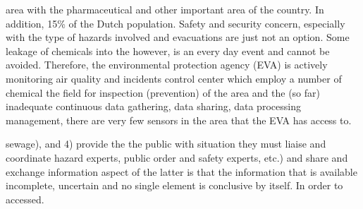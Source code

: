\documentclass[times]{cpeauth}
\begin{document}
area with the %
pharmaceutical and other %
important area of the country. In addition, %
15\% of the Dutch population. Safety and security %
concern, especially with the type of hazards involved and %
evacuations are just not an option. Some leakage of chemicals into the %
however, is an every day event and cannot be avoided. Therefore, the %
environmental protection agency (EVA) is actively monitoring air quality and
incidents %
control center which %
employ a number of chemical %
the field for inspection (prevention) %
of the area and the (so far) inadequate %
continuous data gathering, data sharing, data processing %
management, there are very few sensors in the area that the EVA has %
access to.

sewage), %
and 4) provide the %
the public with situation %
they must liaise and coordinate %
hazard experts, public order and safety %
experts, etc.) and share and exchange information %
aspect of the latter is that the information that is available %
incomplete, uncertain and no single element is conclusive by itself. In order to
accessed.

\end{document}
